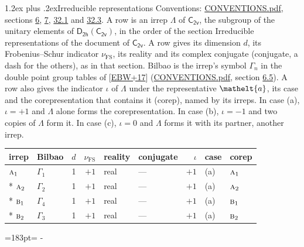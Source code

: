 \documentclass[10pt,a4paper]{article}
\makeatletter
\renewcommand\section{\@startsection{section}{1}{\z@}{-3ex plus -1ex minus -.2ex}%
  {1.2ex plus .2ex}{\normalfont\large\sffamily\bfseries\color{parttitle}}}
\newcommand{\needspace}[1]{\par\penalty-100\begingroup\dimen0=#1\relax\dimen2=\pagegoal
  \advance\dimen2-\pagetotal\ifdim\dimen0>\dimen2\relax\ifdim\dimen2>0pt\vfil\break\fi\fi
  \endgroup}
\numberwithin{equation}{section}
\newcommand{\eltfont}[1]{{\let\sigma\eltsigma\mathelt{#1}}}
\newcommand{\grp}[1]{\mathsf{#1}}
\newcommand{\irr}[1]{\text{\normalfont\scshape #1}}
\newcommand{\elt}[1]{\eltfont{#1}}
\newcommand{\fsind}{\nu_{\mathrm{FS}}}
\makeatother
\begin{document}
\section{Irreducible representations}\label{s:irreps}
Conventions: \href{../../CONVENTIONS.pdf}{CONVENTIONS.pdf}, sections \href{../../../rotation/CONVENTIONS.pdf\#conv.6}{6}, \href{../../../rotation/CONVENTIONS.pdf\#conv.7}{7}, \href{../../CONVENTIONS.pdf\#conv.32.1}{32.1} and \href{../../CONVENTIONS.pdf\#conv.32.3}{32.3}.
\leavevmode\label{n:irrep.Delta}A row is an irrep $\Lambda$ of $\grp{C_{2v}}$, the subgroup of the unitary elements of $\grp{D_{2h}}(\grp{C_{2v}})$, in the order of the section Irreducible representations of the document of \href{../../../rotation/data/pdf/C2v.pdf}{$\grp{C_{2v}}$}. \label{n:index.dimension}\label{n:index.frobenius}\label{n:head.irrep}\label{n:head.reality}\label{n:head.conjugate}A row gives its dimension $d$, its Frobenius--Schur indicator $\fsind$, its reality and its complex conjugate (conjugate, a dash for the others), as in that section. \label{n:head.bilbao}\label{n:irrep.alias.gamma}Bilbao is the irrep's symbol $\Gamma_n$ in the double point group tables of [\href{../../../REFERENCES.pdf\#ref.EBW+17}{EBW+17}] (\href{../../CONVENTIONS.pdf}{CONVENTIONS.pdf}, section \href{../../../rotation/CONVENTIONS.pdf\#conv.6.5}{6.5}). \label{n:head.case.corep}\label{n:head.corep}A row also gives the indicator $\iota$ of $\Lambda$ under the representative $\elt{a}$, its case and the corepresentation that contains it (corep), named by its irreps. In case (a), $\iota = +1$ and $\Lambda$ alone forms the corepresentation. In case (b), $\iota = -1$ and two copies of $\Lambda$ form it. In case (c), $\iota = 0$ and $\Lambda$ forms it with its partner, another irrep.
\setlength{\emergencystretch}{2em}\par\setlength{\emergencystretch}{0pt}
{\small\renewcommand{\arraystretch}{1.25}\setlength{\tabcolsep}{4pt}\begin{longtable}{@{}llrrllrll@{}}\toprule
irrep & Bilbao & $d$ & $\fsind$ & reality & conjugate & $\iota$ & case & corep\\\midrule\endhead
\bottomrule\endfoot\endlastfoot
$\irr{a}_{1}$ & $\Gamma_{1}$ & 1 & $+1$ & real & --- & $+1$ & (a) & $\irr{a}_{1}$\\*
$\irr{a}_{2}$ & $\Gamma_{2}$ & 1 & $+1$ & real & --- & $+1$ & (a) & $\irr{a}_{2}$\\*
$\irr{b}_{1}$ & $\Gamma_{4}$ & 1 & $+1$ & real & --- & $+1$ & (a) & $\irr{b}_{1}$\\*
$\irr{b}_{2}$ & $\Gamma_{3}$ & 1 & $+1$ & real & --- & $+1$ & (a) & $\irr{b}_{2}$\\
\bottomrule\end{longtable}}
\needspace{183pt}
\end{document}
